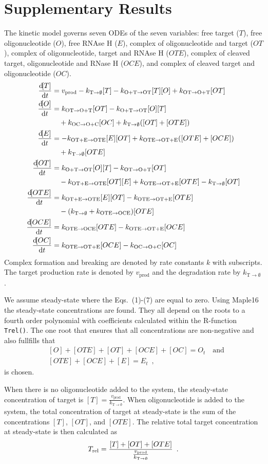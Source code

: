 \documentclass[a4paper,11pt]{article}
\newcommand{\kmo}{k_{\mathrm{OT \to O+T}}}
\newcommand{\kOpT}{k_{\mathrm{O+T \to OT}}}
\newcommand{\kmt}{k_{\mathrm{OTE \to OT+E}}}
\newcommand{\kt}{k_{\mathrm{OT+E \to OTE}}}
\newcommand{\kE}{k_{\mathrm{OTE \to OCE}}}
\newcommand{\kD}{k_{\mathrm{OC \to O+C}}}
\newcommand{\vp}{v_{\mathrm{prod}}}
\newcommand{\vd}{k_{\mathrm{T \to \emptyset}}}
\newcommand{\Trel}{T_{\rm{rel}}}
\begin{document}
\section{Supplementary Results}
The kinetic model governs seven ODEs of the seven variables: free target ($T$), free oligonucleotide ($O$), free RNAse H ($E$), complex of oligonucleotide and target ($OT$), complex of oligonucleotide, target and RNAse H  ($OTE$), complex of cleaved target, oligonucleotide and RNase H ($OCE$), and complex of cleaved target and oligonucleotide  ($OC$).
\begin{align}
\frac{\dif [T]}{\dif t} &= \vp - \vd [T]-\kOpT [T] [O] +\kmo [OT] \\
\frac{\dif [O]}{\dif t}&= \kmo [OT]-\kOpT[O][T] \nonumber  \\
  & \quad +\kD [OC]+\vd([OT]+[OTE])  \\
\frac{\dif [E]}{\dif t} &= -\kt[E][OT]+\kmt([OTE]+[OCE]) \nonumber \\
  & \quad+\vd[OTE]\\
\frac{\dif [OT]}{\dif t} &= \kOpT [O][T]-\kmo[OT] \nonumber \\
	& \quad -\kt[OT][E]+\kmt [OTE]-\vd[OT] \\
\frac{\dif [OTE]}{\dif t} &= \kt[E][OT]-\kmt[OTE] \nonumber \\
	& \quad -(\vd+\kE)[OTE]\\
\frac{\dif [OCE]}{\dif t}& = \kE [OTE]-\kmt [OCE]\\
\frac{\dif [OC]}{\dif t}& = \kmt [OCE]-\kD [OC]
\end{align}
Complex formation and breaking are denoted by rate constants $k$ with subscripts. The target production rate is denoted by $\vp$ and the degradation rate by $\vd$.

We assume steady-state where the Eqs.~(1)-(7) are equal to zero. Using Maple16 the steady-state concentrations are found. They all depend on the roots to a fourth order polynomial with coefficients calculated within the R-function \texttt{Trel()}. The one root that ensures that all concentrations are non-negative and also fullfills that
\begin{align*}
 &[O]+[OTE]+[OT]+[OCE]+[OC] = O_t \quad \mathrm{and}\\ 
 &[OTE]+[OCE]+[E] = E_t \enspace,
\end{align*}
is chosen. 

When there is no oligonucleotide added to the system, the steady-state concentration of target is $[T]=\frac{\vp}{ \vd}$. When oligonucleotide is added to the system, the total concentration of target at steady-state is the sum of the concentrations $[T]$, $[OT]$, and $[OTE]$. The relative total target concentration at steady-state is then calculated as 
\begin{equation}
\Trel = \frac{[T]+[OT]+[OTE]}{\frac{\vp}{ \vd}} \enspace.
\end{equation}
\end{document}

